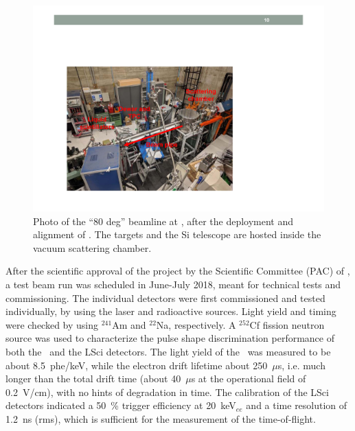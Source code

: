 \begin{figure}[t!]
\centering
\includegraphics[width=\columnwidth]{./Figures/BeamLineDisplay.pdf}
\caption[Picture of the \LNS\ beamline in use for \ReD]{Photo of the ``80 deg'' beamline at \LNS, after the deployment and alignment of \ReD.  The targets and the Si telescope are hosted inside the vacuum scattering chamber.}
\label{fig:BeamlinePhoto}
\end{figure}

After the scientific approval of the project by the Scientific Committee (PAC) of \LNS, a test beam run was scheduled in June-July 2018, meant for technical tests and commissioning. The individual detectors were first commissioned and tested individually, by using the laser and radioactive sources. Light yield and timing were checked by using $^{241}$Am and $^{22}$Na, respectively.  A $^{252}$Cf fission neutron source was used to characterize the pulse shape discrimination performance of both the \LArTPC\ and the LSci detectors. The light yield of the \TPC\ was measured to be about 8.5~phe/keV, while the electron drift lifetime about 250~$\mu$s, i.e. much longer than the total drift time (about 40~$\mu$s at the operational field of 0.2~V/cm), with no hints of degradation in time. The calibration of the LSci detectors indicated a \SI{50}{\percent} trigger efficiency at 20~keV$_{ee}$ and a time resolution of 1.2~ns (rms), which is sufficient for the measurement of the time-of-flight.

